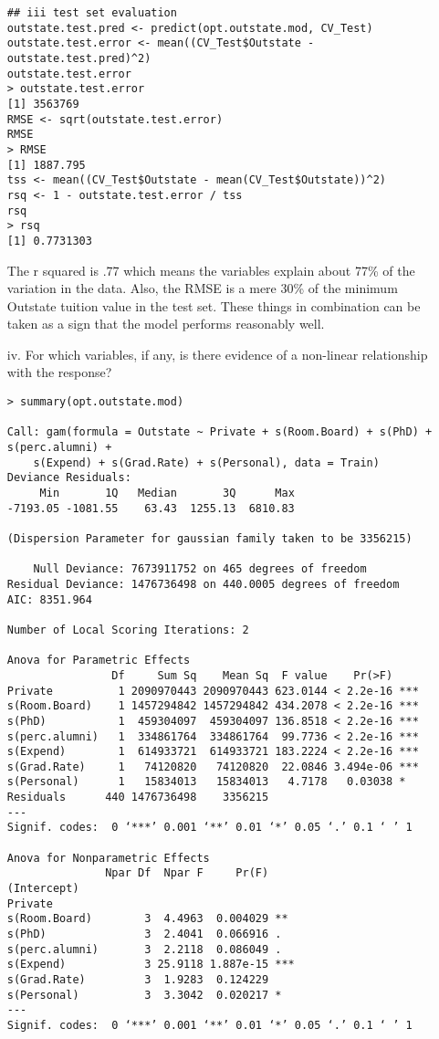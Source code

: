 \documentclass[11pt]{report}
\begin{document}
\begin{itemize}
\begin{verbatim}
## iii test set evaluation
outstate.test.pred <- predict(opt.outstate.mod, CV_Test)
outstate.test.error <- mean((CV_Test$Outstate - outstate.test.pred)^2)
outstate.test.error
> outstate.test.error
[1] 3563769
RMSE <- sqrt(outstate.test.error)
RMSE
> RMSE
[1] 1887.795
tss <- mean((CV_Test$Outstate - mean(CV_Test$Outstate))^2)
rsq <- 1 - outstate.test.error / tss
rsq
> rsq
[1] 0.7731303
\end{verbatim}

The r squared is .77 which means the variables explain about 77\% of the variation in the data. Also, the RMSE is a mere 30\% of the minimum Outstate tuition value in the test set. These things in combination can be taken as a sign that the model performs reasonably well.

\item[iv. ] For which variables, if any, is there evidence of a non-linear relationship with the response?
\begin{verbatim}
> summary(opt.outstate.mod)

Call: gam(formula = Outstate ~ Private + s(Room.Board) + s(PhD) + s(perc.alumni) + 
    s(Expend) + s(Grad.Rate) + s(Personal), data = Train)
Deviance Residuals:
     Min       1Q   Median       3Q      Max 
-7193.05 -1081.55    63.43  1255.13  6810.83 

(Dispersion Parameter for gaussian family taken to be 3356215)

    Null Deviance: 7673911752 on 465 degrees of freedom
Residual Deviance: 1476736498 on 440.0005 degrees of freedom
AIC: 8351.964 

Number of Local Scoring Iterations: 2 

Anova for Parametric Effects
                Df     Sum Sq    Mean Sq  F value    Pr(>F)    
Private          1 2090970443 2090970443 623.0144 < 2.2e-16 ***
s(Room.Board)    1 1457294842 1457294842 434.2078 < 2.2e-16 ***
s(PhD)           1  459304097  459304097 136.8518 < 2.2e-16 ***
s(perc.alumni)   1  334861764  334861764  99.7736 < 2.2e-16 ***
s(Expend)        1  614933721  614933721 183.2224 < 2.2e-16 ***
s(Grad.Rate)     1   74120820   74120820  22.0846 3.494e-06 ***
s(Personal)      1   15834013   15834013   4.7178   0.03038 *  
Residuals      440 1476736498    3356215                       
---
Signif. codes:  0 ‘***’ 0.001 ‘**’ 0.01 ‘*’ 0.05 ‘.’ 0.1 ‘ ’ 1

Anova for Nonparametric Effects
               Npar Df  Npar F     Pr(F)    
(Intercept)                                 
Private                                     
s(Room.Board)        3  4.4963  0.004029 ** 
s(PhD)               3  2.4041  0.066916 .  
s(perc.alumni)       3  2.2118  0.086049 .  
s(Expend)            3 25.9118 1.887e-15 ***
s(Grad.Rate)         3  1.9283  0.124229    
s(Personal)          3  3.3042  0.020217 *  
---
Signif. codes:  0 ‘***’ 0.001 ‘**’ 0.01 ‘*’ 0.05 ‘.’ 0.1 ‘ ’ 1
\end{verbatim}


\end{itemize}
\end{document}
